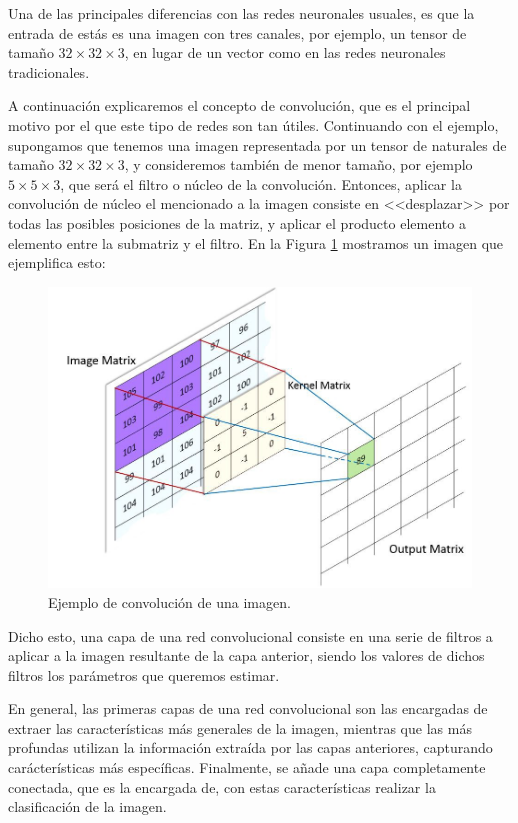 \documentclass[
  a4paper,
  12pt,
  spanish,
]{scrartcl}
\theoremstyle{teorema-style}
\begin{document}
Una de las principales diferencias con las redes neuronales usuales, es que la entrada de estás es una imagen con tres canales, por ejemplo, un tensor de tamaño $32\times 32 \times 3$, en lugar de un vector como en las redes neuronales tradicionales.

A continuación explicaremos el concepto de convolución, que es el principal motivo por el que este tipo de redes son tan útiles. Continuando con el ejemplo, supongamos que tenemos una imagen representada por un tensor de naturales de tamaño $32\times 32 \times 3$, y consideremos también de menor tamaño, por ejemplo $5 \times 5 \times 3$, que será el filtro o núcleo de la convolución. Entonces, aplicar la convolución de núcleo el mencionado a la imagen consiste en <<desplazar>> por todas las posibles posiciones de la matriz, y aplicar el producto elemento a elemento entre la submatriz y el filtro. En la Figura \ref{fig:conv} mostramos un imagen que ejemplifica esto:

\begin{figure}[h]
    \centering
    \includegraphics[width=0.7\linewidth]{img/conv.jpeg}
    \caption{Ejemplo de convolución de una imagen.}%
    \label{fig:conv}
\end{figure}

Dicho esto, una capa de una red convolucional consiste en una serie de filtros a aplicar a la imagen resultante de la capa anterior, siendo los valores de dichos filtros los parámetros que queremos estimar.

En general, las primeras capas de una red convolucional son las encargadas de extraer las características más generales de la imagen, mientras que las más profundas utilizan la información extraída por las capas anteriores, capturando carácterísticas más específicas. Finalmente, se añade una capa completamente conectada, que es la encargada de, con estas características realizar la clasificación de la imagen.
\end{document}
